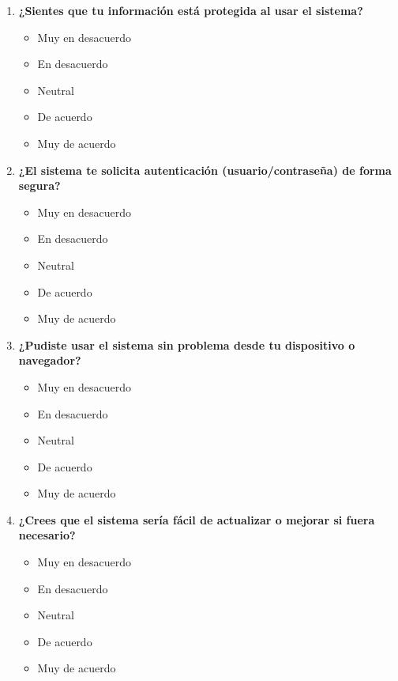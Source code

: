 \documentclass[conference]{IEEEtran}
\begin{document}
\begin{enumerate}
    \item \textbf{¿Sientes que tu información está protegida al usar el sistema?}
        \begin{itemize}
            \item Muy en desacuerdo
            \item En desacuerdo
            \item Neutral
            \item De acuerdo
            \item Muy de acuerdo
        \end{itemize}
        
    \item \textbf{¿El sistema te solicita autenticación (usuario/contraseña) de forma segura?}
        \begin{itemize}
            \item Muy en desacuerdo
            \item En desacuerdo
            \item Neutral
            \item De acuerdo
            \item Muy de acuerdo
        \end{itemize}
        
    \item \textbf{¿Pudiste usar el sistema sin problema desde tu dispositivo o navegador?}
        \begin{itemize}
            \item Muy en desacuerdo
            \item En desacuerdo
            \item Neutral
            \item De acuerdo
            \item Muy de acuerdo
        \end{itemize}
        
    \item \textbf{¿Crees que el sistema sería fácil de actualizar o mejorar si fuera necesario?}
        \begin{itemize}
            \item Muy en desacuerdo
            \item En desacuerdo
            \item Neutral
            \item De acuerdo
            \item Muy de acuerdo
        \end{itemize}
        

\end{enumerate}
\end{document}
